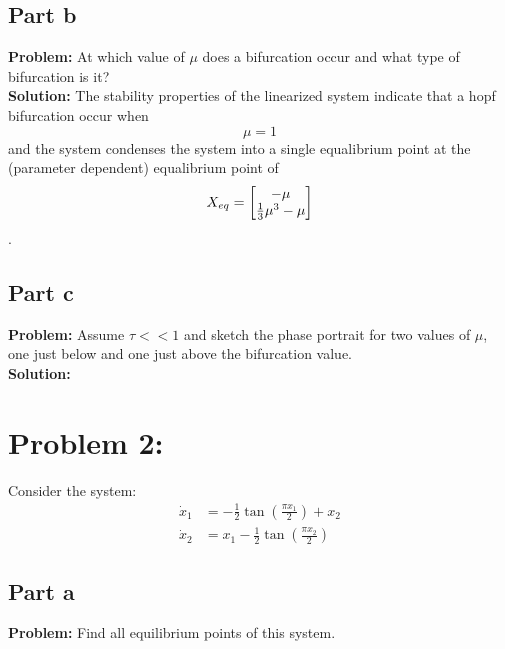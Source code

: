 \documentclass[letter]{article}
\numberwithin{equation}{section}
\begin{document}
\newpage
\subsection{Part b}
\textbf{Problem:}
At which value of $\mu$ does a bifurcation occur and what type of bifurcation is it?\\

\noindent
\textbf{Solution:}
The stability properties of the linearized system indicate that a hopf bifurcation occur when $$\mu = 1$$ and the system condenses the system into a single equalibrium point at the (parameter dependent) equalibrium point of $$X_{eq} = \mqty[-\mu\\\frac{1}{3}\mu^3 - \mu]$$.


\subsection{Part c}
\textbf{Problem:}
Assume $\tau << 1$ and sketch the phase portrait for two values of $\mu$, one just below and one just above the bifurcation value.\\

\noindent
\textbf{Solution:}













\newpage
\section{Problem 2:}
Consider the system:
\begin{equation}
	\begin{aligned}
		\dot{x}_1 &= -\frac{1}{2} \tan(\frac{\pi x_1}{2}) + x_2\\
		\dot{x}_2 &= x_1 -\frac{1}{2} \tan(\frac{\pi x_2}{2})
	\end{aligned}
\end{equation}


\subsection{Part a}
\textbf{Problem:}
Find all equilibrium points of this system.\\
\end{document}
